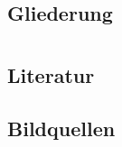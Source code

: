 \tuctwoheadlines{}


\subsection*{Gliederung}
\begin{frame}
    \frametitle{\currentsectionname}
    \tableofcontents


\end{frame}

%
%





\tucthreeheadlines{}
\begin{frame}
    \begin{center}
    \end{center}
\end{frame}

\tuctwoheadlines{}
\section*{\ShortTitle}
\subsection*{Literatur}
\begin{frame}
    \frametitle{\currentsectionname}
    
\end{frame}

\subsection*{Bildquellen}
\begin{frame}
    \frametitle{\currentsectionname}
    \printendnotes{}
\end{frame}


